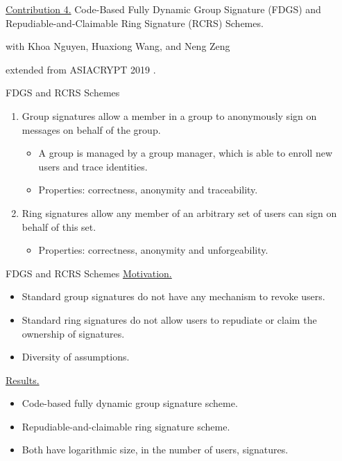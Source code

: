 \begin{frame}{}
	\underline{Contribution 4.} Code-Based Fully Dynamic Group Signature (FDGS) and Repudiable-and-Claimable Ring Signature (RCRS) Schemes.
	
	{\small with Khoa Nguyen, Huaxiong Wang, and Neng Zeng}
	
	extended from ASIACRYPT 2019 \cite{NguyenTWZ19}.
\end{frame}

\begin{frame}{FDGS and RCRS Schemes}
	\begin{enumerate}
		\item Group signatures allow a member in a group to anonymously sign on messages on behalf of the group.\pause
		\begin{itemize}
			\item A group is managed by a group manager, which is able to enroll new users and trace identities.\pause
			\item Properties: correctness, anonymity and traceability.\pause
		\end{itemize}
		\item Ring signatures allow any member of an arbitrary set of users can sign on behalf of this set.\pause
		\begin{itemize}
			\item Properties: correctness, anonymity and unforgeability.
		\end{itemize}
	\end{enumerate}
\end{frame}

\begin{frame}{FDGS and RCRS Schemes}
	\underline{Motivation.}\pause
	\begin{itemize}
		\item Standard group signatures do not have any mechanism to revoke users.\pause
		\item Standard ring signatures do not allow users to repudiate or claim the ownership of signatures.\pause
		\item Diversity of assumptions.\pause
	\end{itemize}
	\underline{Results.}\pause
	\begin{itemize}
		\item Code-based fully dynamic group signature scheme.\pause
		\item Repudiable-and-claimable ring signature scheme.\pause
		\item Both have logarithmic size, in the number of users, signatures.
	\end{itemize}
\end{frame}

